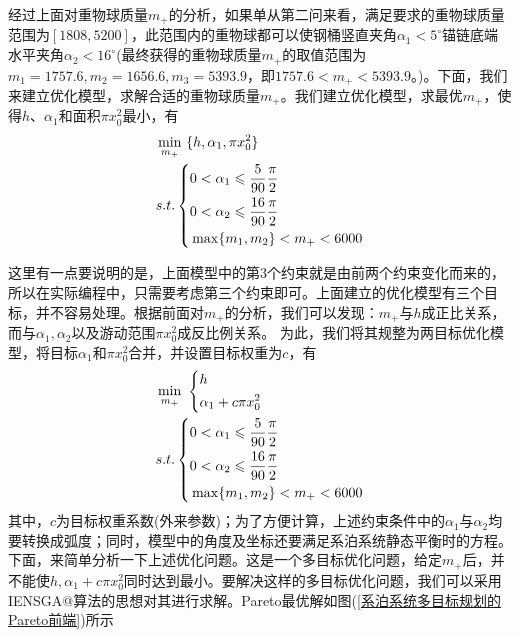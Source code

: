 \documentclass[UTF8]{ctexbook}
\makeatletter
\theoremstyle{nonumberplain}
\newcommand*{\rom}[1]{\expandafter\@slowromancap\romannumeral #1@}
\makeatother
\begin{document}
            \par
            经过上面对重物球质量$m_+$的分析，如果单从第二问来看，满足要求的重物球质量范围为$[1808,5200]$，此范围内的重物球都可以使钢桶竖直夹角$\alpha_1 <5^\circ$锚链底端水平夹角$\alpha_2 <16^\circ$(最终获得的重物球质量$m_+$的取值范围为$ m_1= 1757.6, m_2=1656.6, m_3=5393.9$，即$1757.6<m_+<5393.9$。)。下面，我们来建立优化模型，求解合适的重物球质量$m_+$。我们建立优化模型，求最优$m_+$，使得$h$、$\alpha_1$和面积$\pi x_0^2$最小，有
            \begin{align}
            \label{系泊系统优化模型1}
            & \min_{m_+} \ \{h,\alpha_1,\pi x_0^2\}\\
            & s.t.\left\{
            \begin{aligned}
            & 0 < \alpha_1 \leqslant \frac{5}{90}\frac{\pi}{2}\\
            & 0 < \alpha_2 \leqslant \frac{16}{90}\frac{\pi}{2}\\
            & \max\{m_1,m_2\} < m_+ < 6000
            \end{aligned}
            \right.\notag
            \end{align}
            \par
            这里有一点要说明的是，上面模型中的第3个约束就是由前两个约束变化而来的，所以在实际编程中，只需要考虑第三个约束即可。上面建立的优化模型有三个目标，并不容易处理。根据前面对$m_+$的分析，我们可以发现：$m_+$与$h$成正比关系，而与$\alpha_1,\alpha_2$以及游动范围$\pi x_0^2$成反比例关系。
            为此，我们将其规整为两目标优化模型，将目标$\alpha_1$和$\pi x_0^2$合并，并设置目标权重为$c$，有
            \begin{align}
            \label{系泊系统优化模型2}
            & \min_{m_+}\ \left\{
            \begin{aligned}
            & h\\
            & \alpha_1+c\pi x_0^2
            \end{aligned}
            \right.\\
            & s.t.\left\{
            \begin{aligned}
            & 0 < \alpha_1 \leqslant \frac{5}{90}\frac{\pi}{2}\\
            & 0 < \alpha_2 \leqslant \frac{16}{90}\frac{\pi}{2}\\
            & \max\{m_1,m_2\} < m_+ < 6000
            \end{aligned}
            \right.\notag
            \end{align}
            其中，$c$为目标权重系数(外来参数)；为了方便计算，上述约束条件中的$\alpha_1$与$\alpha_2$均要转换成弧度；同时，模型中的角度及坐标还要满足系泊系统静态平衡时的方程。下面，来简单分析一下上述优化问题。这是一个多目标优化问题，给定$m_+$后，并不能使$h,\alpha_1+c\pi x_0^2$同时达到最小。要解决这样的多目标优化问题，我们可以采用IENSGA\rom{2}算法的思想对其进行求解。Pareto最优解如图(\ref{系泊系统多目标规划的Pareto前端})所示
\end{document}

